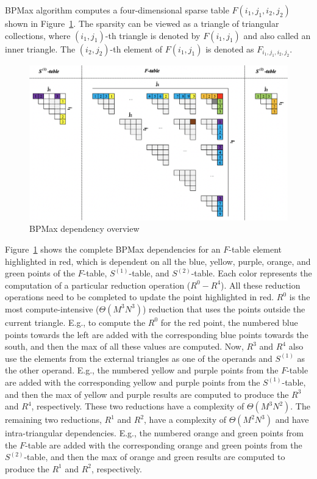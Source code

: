 BPMax algorithm computes a four-dimensional sparse table $F(i_{1}, j_{1}, i_{2}, j_{2})$ shown in Figure~\ref{fig:bpmax_dependency}. The sparsity can be viewed as a triangle of triangular collections, where  $(i_{1}, j_{1})$-th triangle is denoted by $F(i_{1}, j_{1})$ and also called an inner triangle. The $(i_{2}, j_{2})$-th element of $F(i_{1}, j_{1})$ is denoted as  $F_{i_{1}, j_{1}, i_{2}, j_{2}}$.  
\begin{figure}[htbp]
\centerline{\includegraphics[scale=.30]{content/figures/bpm_dependency.png}}
\caption{BPMax dependency overview}
\label{fig:bpmax_dependency}
\end{figure}
Figure~\ref{fig:bpmax_dependency} shows the complete BPMax dependencies for an $F$-table element highlighted in red, which is dependent on all the blue, yellow, purple, orange, and green points of the $F$-table, $S^{(1)}$-table,  and $S^{(2)}$-table. Each color represents the computation of a particular reduction operation ($R^{0} - R^{4}$). %
All these reduction operations need to be completed to update the point highlighted in red. $R^{0}$ is the most compute-intensive ($\Theta({M^3N^3})$) reduction that uses the points outside the current triangle. E.g., to compute the $R^{0}$ for the red point,  the numbered blue points towards the left are added with the corresponding blue points towards the south, and then the max of all these values are computed. Now, $R^{3}$ and $R^{4}$ also use the elements from the external triangles as one of the operands and  $S^{(1)}$ as the other operand. E.g., the numbered yellow and purple points from the $F$-table are added with the corresponding yellow and purple points from the $S^{(1)}$-table, and then the max of yellow and purple results are computed to produce the $R^{3}$ and $R^{4}$, respectively. These two reductions have a complexity of $\Theta(M^3N^2)$. The remaining two reductions, $R^{1}$ and $R^{2}$, have a complexity of $\Theta(M^2N^3)$ and have intra-triangular dependencies. E.g., the numbered orange and green points from the $F$-table are added with the corresponding orange and green points from the $S^{(2)}$-table, and then the max of orange and green results are computed to produce the $R^{1}$ and $R^{2}$, respectively.




